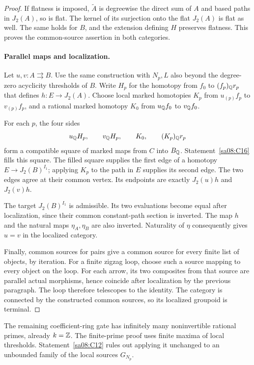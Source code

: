 \begin{proof}
If flatness is imposed, $\widetilde A$ is degreewise the direct
sum of $A$ and based paths in $J_2(A)$, so is flat. The kernel of
its surjection onto the flat $J_2(A)$ is flat as well. The same
holds for $B$, and the extension defining $H$ preserves flatness.
This proves the common-source assertion in both categories.

\paragraph{Parallel maps and localization.}
Let $u,v:A\rightrightarrows B$. Use the same construction with
$N_p,L$ also beyond the degree-zero acyclicity thresholds of $B$.
Write $H_p$ for the homotopy from $f_0$ to $(f_p)_{\mathbb Q}r_p$ that
defines $h:E\to J_2(A)$. Choose local marked homotopies $K_p$
from $u_{(p)}f_p$ to $v_{(p)}f_p$, and a rational marked homotopy
$K_0$ from $u_{\mathbb Q}f_0$ to $v_{\mathbb Q}f_0$.

For each $p$, the four sides
\[
 u_{\mathbb Q}H_p,\qquad v_{\mathbb Q}H_p,\qquad
 K_0,\qquad (K_p)_{\mathbb Q}r_p
\]
form a compatible square of marked maps from $C$ into $B_{\mathbb Q}$.
Statement~\ref{sa08:C16} fills this square. The filled square
supplies the first edge of a homotopy
$E\to J_2(B)^{I_1}$; applying $K_p$ to the path in $E$ supplies
its second edge. The two edges agree at their common vertex.
Its endpoints are exactly $J_2(u)h$ and $J_2(v)h$.

The target $J_2(B)^{I_1}$ is admissible. Its two evaluations become
equal after localization, since their common constant-path section
is inverted. The map $h$ and the natural maps $\eta_A,\eta_B$ are
also inverted. Naturality of $\eta$ consequently gives $u=v$ in
the localized category.

Finally, common sources for pairs give a common source for every
finite list of objects, by iteration. For a finite zigzag loop,
choose such a source mapping to every object on the loop. For
each arrow, its two composites from that source are parallel
actual morphisms, hence coincide after localization by the previous
paragraph. The loop therefore telescopes to the identity. The
category is connected by the constructed common sources, so its
localized groupoid is terminal.
\end{proof}

The remaining coefficient-ring gate has infinitely many noninvertible
rational primes, already $k=\mathbb Z$. The finite-prime proof uses finite
maxima of local thresholds. Statement~\ref{sa08:C12} rules out applying
it unchanged to an unbounded family of the local sources $G_{N_p}$.
